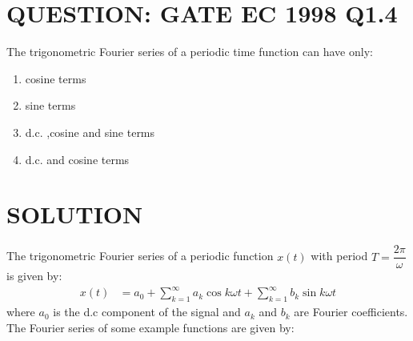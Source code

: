 \documentclass[journal,12pt,twocolumn]{IEEEtran}
\begin{document}
\section{QUESTION: GATE EC 1998 Q1.4}
The trigonometric Fourier series of a periodic time function can have only:
\begin{enumerate}[label=(\Alph*)]
\item cosine terms 
\item sine terms
\item d.c. ,cosine and sine terms
\item d.c. and cosine terms 
\end{enumerate}
\section{SOLUTION}
The trigonometric Fourier series of a periodic function $x(t)$ with period $T = \dfrac{2 \pi}{\omega}$ is given by:
\begin{align}
x(t) &= a_{0} + \sum_{k=1}^{\infty}a_{k}\cos{k\omega t} +\sum_{k=1}^{\infty}b_{k}\sin{k\omega t}
\end{align}
where $a_{0}$ is the d.c component of the signal and $a_{k}$ and $b_{k}$ are Fourier coefficients. The Fourier series of some example functions are given by:
\end{document}

